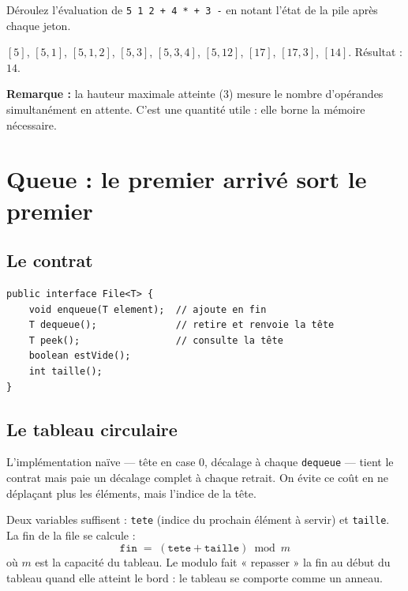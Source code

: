 \documentclass[11pt,a4paper]{article}
\theoremstyle{definition}
\theoremstyle{remark}
\begin{document}
\begin{appliboxQ}
Déroulez l'évaluation de \texttt{5 1 2 + 4 * + 3 -} en notant l'état de la
pile après chaque jeton.
\end{appliboxQ}

\begin{appliboxR}[Réponse]
$[5]$, $[5,1]$, $[5,1,2]$, $[5,3]$, $[5,3,4]$, $[5,12]$, $[17]$, $[17,3]$,
$[14]$. Résultat : $14$.

\textbf{Remarque :} la hauteur maximale atteinte (3) mesure le nombre
d'opérandes simultanément en attente. C'est une quantité utile : elle borne
la mémoire nécessaire.
\end{appliboxR}

\section{Queue : le premier arrivé sort le premier}

\subsection{Le contrat}

\begin{lstlisting}[caption={L'ADT Queue}]
public interface File<T> {
    void enqueue(T element);  // ajoute en fin
    T dequeue();              // retire et renvoie la tête
    T peek();                 // consulte la tête
    boolean estVide();
    int taille();
}
\end{lstlisting}

\subsection{Le tableau circulaire}

L'implémentation naïve --- tête en case $0$, décalage à chaque
\texttt{dequeue} --- tient le contrat mais paie un décalage complet à chaque
retrait. On évite ce coût en ne déplaçant plus les éléments, mais l'indice de
la tête.

Deux variables suffisent : \texttt{tete} (indice du prochain élément à
servir) et \texttt{taille}. La fin de la file se calcule :
\[
\texttt{fin} \;=\; (\texttt{tete} + \texttt{taille}) \bmod m
\]
où $m$ est la capacité du tableau. Le modulo fait « repasser » la fin au
début du tableau quand elle atteint le bord : le tableau se comporte comme un
anneau.
\end{document}
